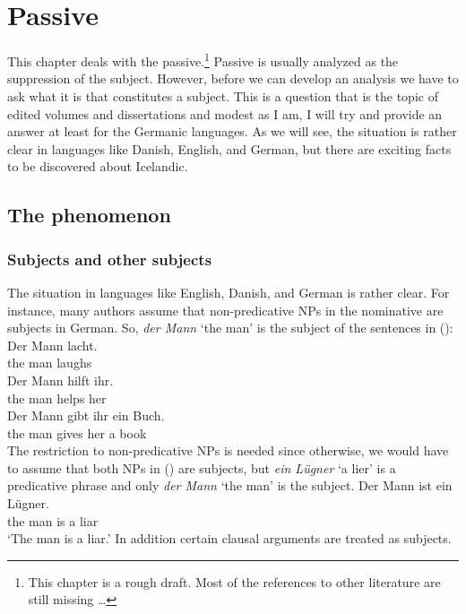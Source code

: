 \chapter{Passive}
\label{sec-icelandic-quirky-subj}
\label{chap-case}

This chapter deals with the passive.\footnote{
This chapter is a rough draft. Most of the references to other literature are still missing \ldots
} Passive is usually analyzed as the suppression of the
subject. However, before we can develop an analysis we have to ask what it is that constitutes a
subject. This is a question that is the topic of edited volumes and dissertations and modest as I
am, I will try and provide an answer at least for the Germanic languages. As we will see, the
situation is rather clear in languages like Danish, English, and German, but there are exciting
facts to be discovered about Icelandic. 


\section{The phenomenon}


\subsection{Subjects and other subjects}
\label{sec-subj-properties}

The situation in languages like English, Danish, and German is rather clear. For instance, many
authors assume that non-predicative NPs in the nominative are subjects in German. So, \emph{der
  Mann} `the man' is the subject of the sentences in (): 
\eal
\ex 
\gll Der Mann lacht.\\
     the man laughs\\
\ex 
\gll Der Mann hilft ihr.\\
     the man  helps her\\
\ex 
\gll Der Mann gibt ihr ein Buch.\\
     the man gives her a book\\
\zl
The restriction to non-predicative NPs is needed since otherwise, we would have to assume that both
NPs in () are subjects, but \emph{ein Lügner} `a lier' is a predicative phrase and only
\emph{der Mann} `the man' is the subject.
\ea
\gll Der Mann ist ein Lügner.\\
     the man is a liar\\
\glt `The man is a liar.'
\z
In addition certain clausal arguments are treated as subjects.

